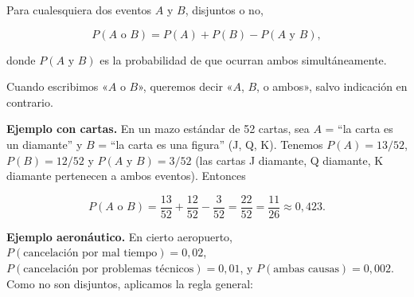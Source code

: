\documentclass[
  spanish,
  letterpaper,
  DIV=11,
  numbers=noendperiod]{scrartcl}
\begin{document}
\begin{tcolorbox}[enhanced jigsaw, arc=.35mm, bottomrule=.15mm, bottomtitle=1mm, breakable, colback=white, colbacktitle=quarto-callout-important-color!10!white, colframe=quarto-callout-important-color-frame, coltitle=black, left=2mm, leftrule=.75mm, opacityback=0, opacitybacktitle=0.6, rightrule=.15mm, title=\textcolor{quarto-callout-important-color}{\faExclamation}\hspace{0.5em}{Regla general de la adición}, titlerule=0mm, toprule=.15mm, toptitle=1mm]

Para cualesquiera dos eventos \(A\) y \(B\), disjuntos o no,

\[P(A \text{ o } B) = P(A) + P(B) - P(A \text{ y } B),\]

donde \(P(A \text{ y } B)\) es la probabilidad de que ocurran ambos
simultáneamente.

\end{tcolorbox}

\begin{tcolorbox}[enhanced jigsaw, arc=.35mm, bottomrule=.15mm, bottomtitle=1mm, breakable, colback=white, colbacktitle=quarto-callout-tip-color!10!white, colframe=quarto-callout-tip-color-frame, coltitle=black, left=2mm, leftrule=.75mm, opacityback=0, opacitybacktitle=0.6, rightrule=.15mm, title=\textcolor{quarto-callout-tip-color}{\faLightbulb}\hspace{0.5em}{«o» es inclusivo en estadística}, titlerule=0mm, toprule=.15mm, toptitle=1mm]

Cuando escribimos «\(A\) o \(B\)», queremos decir «\(A\), \(B\), o
ambos», salvo indicación en contrario.

\end{tcolorbox}

\textbf{Ejemplo con cartas.} En un mazo estándar de 52 cartas, sea \(A\)
= ``la carta es un diamante'' y \(B\) = ``la carta es una figura'' (J,
Q, K). Tenemos \(P(A) = 13/52\), \(P(B) = 12/52\) y
\(P(A \text{ y } B) = 3/52\) (las cartas J diamante, Q diamante, K
diamante pertenecen a ambos eventos). Entonces

\[P(A \text{ o } B) = \frac{13}{52} + \frac{12}{52} - \frac{3}{52} = \frac{22}{52} = \frac{11}{26} \approx 0{,}423.\]

\textbf{Ejemplo aeronáutico.} En cierto aeropuerto,
\(P(\text{cancelación por mal tiempo}) = 0{,}02\),
\(P(\text{cancelación por problemas técnicos}) = 0{,}01\), y
\(P(\text{ambas causas}) = 0{,}002\). Como no son disjuntos, aplicamos
la regla general:
\end{document}
